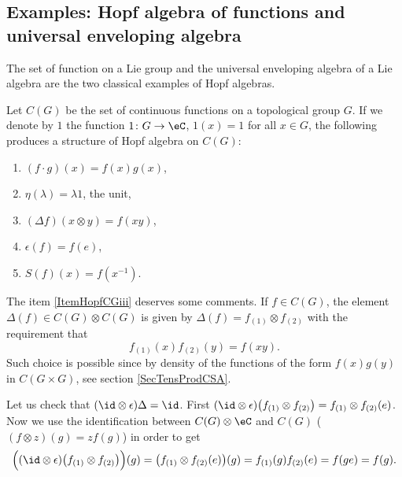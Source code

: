 \subsection{Examples: Hopf algebra of functions and universal enveloping algebra}
\label{SubSecHoptUnivecvgp}

The set of function on a Lie group and the universal enveloping algebra of a Lie algebra are the two classical examples of Hopf algebras.
\begin{definition}		\label{DefHopfsurCG}
	Let $C(G)$ be the set of continuous functions on a topological group $G$. If we denote by $1$ the function $1\colon G\to \eC$, $1(x)=1$ for all $x\in G$, the following produces a structure of Hopf algebra on $C(G)$:
\begin{enumerate}
		\item
			$(f\cdot g)(x)=f(x)g(x)$,
		\item
			$\eta(\lambda)=\lambda 1$, the unit,
		\item\label{ItemHopfCGiii}
			$(\Delta f)(x\otimes y)=f(xy)$,
		\item\label{ItemHopfCGiv}
			$\epsilon(f)=f(e)$,
		\item
			$S(f)(x)=f(x^{-1})$.
	\end{enumerate}
\end{definition}

The item \ref{ItemHopfCGiii} deserves some comments. If $f\in C(G)$, the element $\Delta(f)\in C(G)\otimes C(G)$ is given by $\Delta(f)=f_{(1)}\otimes f_{(2)}$ with the requirement that
\begin{equation}
	f_{(1)}(x)f_{(2)}(y)=f(xy).
\end{equation}
Such choice is possible since by density of the functions of the form $f(x)g(y)$ in $C(G\times G)$, see section \ref{SecTensProdCSA}.

Let us check that $(\id\otimes\epsilon)\Delta=\id$. First $(\id\otimes\epsilon)\big( f_{(1)}\otimes f_{(2)} \big)=f_{(1)}\otimes f_{(2)}(e)$. Now we use the identification between $C(G)\otimes \eC$ and $C(G)$ ($(f\otimes z)(g)=zf(g)$) in order to get
\begin{equation}
	\Big( (\id\otimes\epsilon)\big( f_{(1)}\otimes f_{(2)} \big) \Big)(g)=\big( f_{(1)}\otimes f_{(2)}(e) \big)(g)=f_{(1)}(g)f_{(2)}(e)=f(ge)=f(g).
\end{equation}

